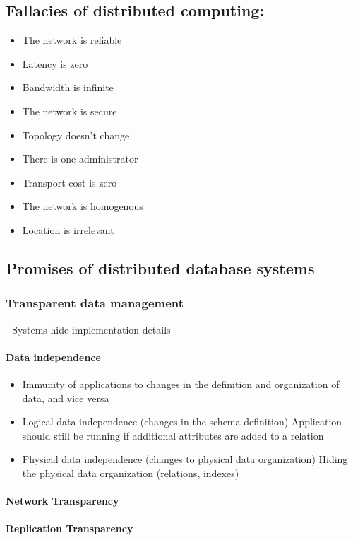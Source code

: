 \documentclass[10pt,a4paper]{article}
\begin{document}
\subsection{Fallacies of distributed computing:}
	\begin{itemize}
		\item The network is reliable
		\item Latency is zero
		\item Bandwidth is infinite
		\item The network is secure
		\item Topology doesn't change
		\item There is one administrator
		\item Transport cost is zero
		\item The network is homogenous
		\item Location is irrelevant
	\end{itemize}

\subsection{Promises of distributed database systems}
	\subsubsection{Transparent data management} - Systems hide implementation details
	\paragraph{Data independence}
		\begin{itemize}
			\item Immunity of applications to changes in the definition and organization of
			data, and vice versa
			\item Logical data independence (changes in the schema definition)
			Application should still be running if additional attributes are added to a
			relation
			\item Physical data independence (changes to physical data organization)
			Hiding the physical data organization (relations, indexes)
		\end{itemize}
	\paragraph{Network Transparency}
	\paragraph{Replication Transparency}
\end{document}
